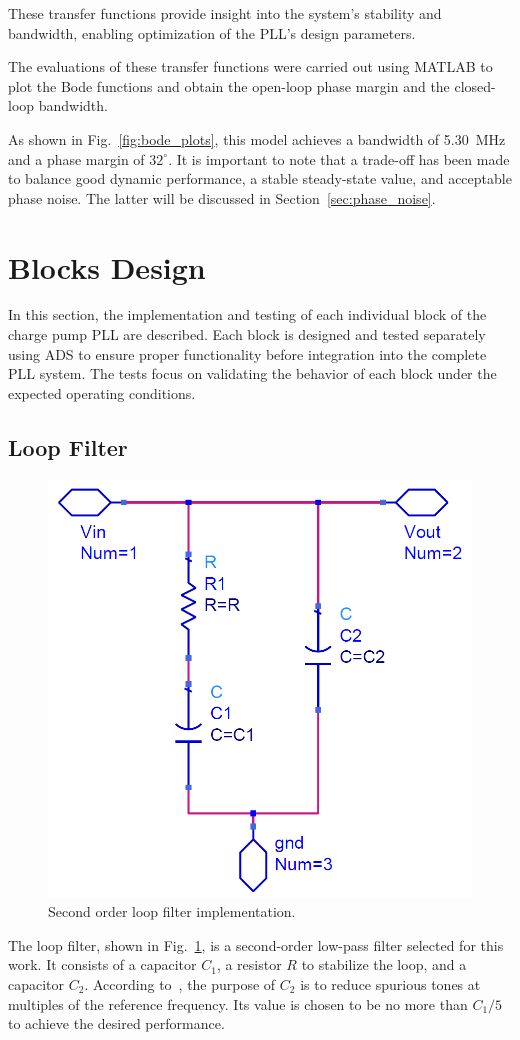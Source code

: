 \documentclass[lettersize,journal]{IEEEtran}
\begin{document}
These transfer functions provide insight into the system's stability and bandwidth, enabling optimization of the PLL's design parameters.

The evaluations of these transfer functions were carried out using MATLAB to plot the Bode functions and obtain the open-loop phase margin and the closed-loop bandwidth.

As shown in Fig.~\ref{fig:bode_plots}, this model achieves a bandwidth of 5.30~MHz and a phase margin of \( 32^\circ \). It is important to note that a trade-off has been made to balance good dynamic performance, a stable steady-state value, and acceptable phase noise. The latter will be discussed in Section~\ref{sec:phase_noise}.


\section{Blocks Design} 
\label{sec:block_design}

In this section, the implementation and testing of each individual block of the charge pump PLL are described. Each block is designed and tested separately using ADS to ensure proper functionality before integration into the complete PLL system. The tests focus on validating the behavior of each block under the expected operating conditions.

\subsection{Loop Filter}
\label{sec:loop_filter}
\begin{figure}[!h]
    \centering
    \includegraphics[width=0.5\linewidth]{images/block_design/LOOP_FILTER/loop_filter.png}
    \caption{Second order loop filter implementation.}
    \label{fig:loop_filter}
\end{figure}

The loop filter, shown in Fig.~\ref{fig:loop_filter}, is a second-order low-pass filter selected for this work. It consists of a capacitor \( C_1 \), a resistor \( R \) to stabilize the loop, and a capacitor \( C_2 \). According to~\cite{razavi2011rf}, the purpose of \( C_2 \) is to reduce spurious tones at multiples of the reference frequency. Its value is chosen to be no more than \( C_1/5 \) to achieve the desired performance.
\end{document}
